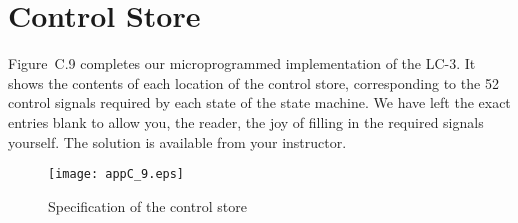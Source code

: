 \documentclass{patt}
\begin{document}
\section{Control Store}

Figure~C.9 completes our microprogrammed implementation of the LC-3.
It shows the contents of each location of the control store,
corresponding to the 52 control signals required by each state of the
state machine.  We have left the exact entries blank to allow you, the
reader, the joy of filling in the required signals yourself.  The
solution is available from your instructor.

\begin{figure}
\hspace*{-8pc}\begin{minipage}{36pc}
\centerline{\texttt{[image: appC\_9.eps]}}
\caption{Specification of the control store}
\label{fig:controlstore}
\end{minipage}
\end{figure}
\end{document}
